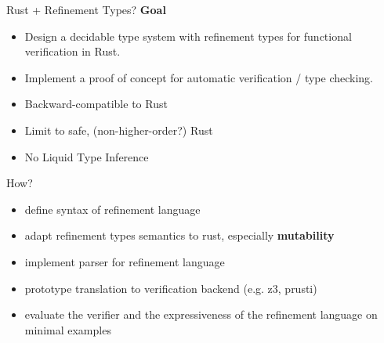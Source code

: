 \documentclass{sdqbeamer}
\begin{document}
\begin{frame}{Rust + Refinement Types?}
  \textbf{Goal}
  \begin{itemize}
    \item Design a decidable type system with refinement types for functional verification in Rust.
    \item Implement a proof of concept for automatic verification / type checking.
    \item Backward-compatible to Rust
    \item Limit to safe, (non-higher-order?) Rust
    \item No Liquid Type Inference
  \end{itemize}
\end{frame}

\begin{frame}{How?}
  \begin{itemize}
    \item define syntax of refinement language
    \item adapt refinement types semantics to rust, especially \textbf{mutability}
    \item implement parser for refinement language
    \item prototype translation to verification backend (e.g. z3, prusti)
    \item evaluate the verifier and the expressiveness of the refinement language on minimal examples
  \end{itemize}
\end{frame}
\end{document}
